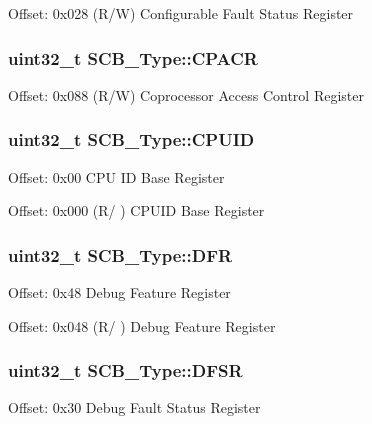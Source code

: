 Offset\-: 0x028 (R/\-W) Configurable Fault Status Register \hypertarget{struct_s_c_b___type_af460b56ce524a8e3534173f0aee78e85}{
\subsubsection[{C\-P\-A\-C\-R}]{ uint32\-\_\-t S\-C\-B\-\_\-\-Type\-::\-C\-P\-A\-C\-R}}\label{struct_s_c_b___type_af460b56ce524a8e3534173f0aee78e85}
Offset\-: 0x088 (R/\-W) Coprocessor Access Control Register \hypertarget{struct_s_c_b___type_afa7a9ee34dfa1da0b60b4525da285032}{
\subsubsection[{C\-P\-U\-I\-D}]{ uint32\-\_\-t S\-C\-B\-\_\-\-Type\-::\-C\-P\-U\-I\-D}}\label{struct_s_c_b___type_afa7a9ee34dfa1da0b60b4525da285032}
Offset\-: 0x00 C\-P\-U I\-D Base Register

Offset\-: 0x000 (R/ ) C\-P\-U\-I\-D Base Register \hypertarget{struct_s_c_b___type_a586a5225467262b378c0f231ccc77f86}{
\subsubsection[{D\-F\-R}]{ uint32\-\_\-t S\-C\-B\-\_\-\-Type\-::\-D\-F\-R}}\label{struct_s_c_b___type_a586a5225467262b378c0f231ccc77f86}
Offset\-: 0x48 Debug Feature Register

Offset\-: 0x048 (R/ ) Debug Feature Register \hypertarget{struct_s_c_b___type_ad7d61d9525fa9162579c3da0b87bff8d}{
\subsubsection[{D\-F\-S\-R}]{ uint32\-\_\-t S\-C\-B\-\_\-\-Type\-::\-D\-F\-S\-R}}\label{struct_s_c_b___type_ad7d61d9525fa9162579c3da0b87bff8d}
Offset\-: 0x30 Debug Fault Status Register

